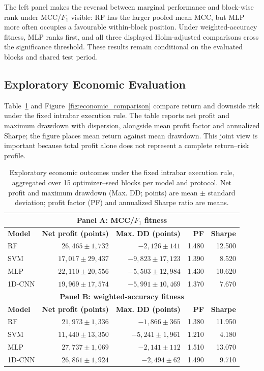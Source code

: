 \pagebreak
The left panel makes the reversal between marginal performance and block-wise rank under MCC/$F_1$ visible: RF has the larger pooled mean MCC, but MLP more often occupies a favourable within-block position. Under weighted-accuracy fitness, MLP ranks first, and all three displayed Holm-adjusted comparisons cross the significance threshold. These results remain conditional on the evaluated blocks and shared test period.

\subsection{Exploratory Economic Evaluation}

Table~\ref{tab:economic_summary} and Figure~\ref{fig:economic_comparison} compare return and downside risk under the fixed intrabar execution rule. The table reports net profit and maximum drawdown with dispersion, alongside mean profit factor and annualized Sharpe; the figure places mean return against mean drawdown. This joint view is important because total profit alone does not represent a complete return--risk profile.

\begin{table}[!htbp]
\centering
\caption{Exploratory economic outcomes under the fixed intrabar execution rule, aggregated over 15 optimizer--seed blocks per model and protocol. Net profit and maximum drawdown (Max. DD; points) are mean $\pm$ standard deviation; profit factor (PF) and annualized Sharpe ratio are means.}
\label{tab:economic_summary}
\manuscripttablestyle
\begin{tabular}{lrrrr}\toprule
\multicolumn{5}{c}{\textbf{Panel A: MCC/$F_1$ fitness}}\\\midrule
\textbf{Model} & \textbf{Net profit (points)} & \textbf{Max. DD (points)} & \textbf{PF} & \textbf{Sharpe}\\\midrule
RF & $26{,}465\pm1{,}732$ & $-2{,}126\pm141$ & 1.480 & 12.500\\
SVM & $17{,}017\pm29{,}437$ & $-9{,}823\pm17{,}123$ & 1.390 & 8.520\\
MLP & $22{,}110\pm20{,}556$ & $-5{,}503\pm12{,}984$ & 1.430 & 10.620\\
1D-CNN & $19{,}969\pm17{,}574$ & $-5{,}991\pm10{,}469$ & 1.370 & 7.670\\\midrule
\multicolumn{5}{c}{\textbf{Panel B: weighted-accuracy fitness}}\\\midrule
\textbf{Model} & \textbf{Net profit (points)} & \textbf{Max. DD (points)} & \textbf{PF} & \textbf{Sharpe}\\\midrule
RF & $21{,}973\pm1{,}336$ & $-1{,}866\pm365$ & 1.380 & 11.950\\
SVM & $11{,}440\pm13{,}350$ & $-5{,}241\pm1{,}961$ & 1.210 & 4.180\\
MLP & $27{,}737\pm1{,}069$ & $-2{,}141\pm112$ & 1.510 & 13.070\\
1D-CNN & $26{,}861\pm1{,}924$ & $-2{,}494\pm62$ & 1.490 & 9.710\\\bottomrule
\end{tabular}
\end{table}

